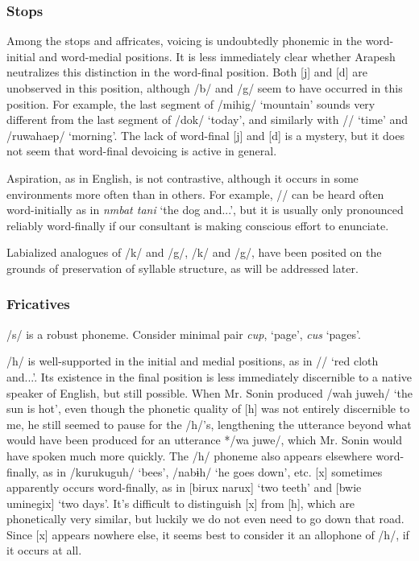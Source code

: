\documentclass[pdftex,12pt,letterpaper]{article}
\let\ipa\textipa
\def\sw{\ipa{\super w}}
\begin{document}
 \subsubsection{Stops} 

 Among the stops and affricates, voicing is undoubtedly phonemic in the word-initial and word-medial positions. It is less immediately clear whether Arapesh neutralizes this distinction in the word-final position. Both [j] and [d] are unobserved in this position, although /b/ and /g/ seem to have occurred in this position. For example, the last segment of /mihig/ `mountain' sounds very different from the last segment of /dok/ `today', and similarly with /\ipa{\textltailn1t@b}/ `time' and /ruwahaep/ `morning'. The lack of word-final [j] and [d] is a mystery, but it does not seem that word-final devoicing is active in general.
 
 Aspiration, as in English, is not contrastive, although it occurs in some environments more often than in others. For example, /\ipa{t\super h}/ can be heard often word-initially as in \emph{n\ipa{1}mbat tani} `the dog and...', but it is usually only pronounced reliably word-finally if our consultant is making conscious effort to enunciate.
 
 Labialized analogues of /k/ and /g/, /k\sw/ and /g\sw/, have been posited on the grounds of preservation of syllable structure, as will be addressed later.

 \subsubsection{Fricatives}

 /s/ is a robust phoneme. Consider minimal pair \emph{cup}, `page', \emph{cus} `pages'. 

 /h/ is well-supported in the initial and medial positions, as in /\ipa{ahwi aropa hani}/ `red cloth and...'. Its existence in the final position is less immediately discernible to a native speaker of English, but still possible. When Mr. Sonin produced /wah juweh/ `the sun is hot', even though the phonetic quality of [h] was not entirely discernible to me, he still seemed to pause for the /h/'s, lengthening the utterance beyond what would have been produced for an utterance */wa juwe/, which Mr. Sonin would have spoken much more quickly. The /h/ phoneme also appears elsewhere word-finally, as in /kurukuguh/ `bees', /nabɨh/ `he goes down', etc. [x] sometimes apparently occurs word-finally, as in [bi\ipa{@}rux narux] `two teeth' and [bwie \ipa{\textltailn}umineg\sw ix] `two days'. It's difficult to distinguish [x] from [h], which are phonetically very similar, but luckily we do not even need to go down that road. Since [x] appears nowhere else, it seems best to consider it an allophone of /h/, if it occurs at all.
 
\end{document}
